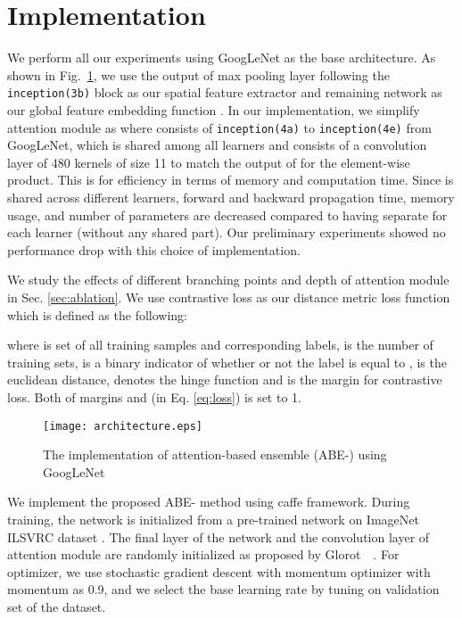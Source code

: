 \documentclass[runningheads]{llncs}
\begin{document}
\vspace{-4mm}
\section{Implementation}
\label{sec:implementation}
\vspace{-2mm}



We perform all our experiments using GoogLeNet \cite{Szegedy_2015_CVPR} as the base architecture. 
As shown in Fig.~\ref{fig:architecture}, 
we use the output of max pooling layer following the \texttt{inception(3b)} block as our spatial feature extractor  and remaining network as our global feature embedding function .
In our implementation, we simplify attention module  as  where  consists of \texttt{inception(4a)} to \texttt{inception(4e)} from GoogLeNet, which is shared among all  learners and  consists of a convolution layer of 480 kernels of size 11 to match the output of  for the element-wise product.
This is for efficiency
in terms of memory and computation time. Since  is shared across
different learners, forward and backward propagation time,
memory usage, and number of parameters are decreased compared to having separate  for each learner
(without any shared part). Our preliminary experiments showed no performance drop with this choice of implementation.

We study the effects of different branching points and depth of attention module in Sec. \ref{sec:ablation}.
We use contrastive loss \cite{hadsell2006dimensionality,bell2015learning,chopra2005learning} as our distance metric loss function which is defined as the following:
\vspace{-2mm}

where  is set of all training samples and corresponding labels,  is the number of training sets,  is a binary indicator of whether or not the label  is equal to ,  is the euclidean distance,  denotes the hinge function  and  is the margin for contrastive loss. Both of margins  and  (in Eq. \ref{eq:loss}) is set to 1.

\begin{figure}[t]
\centering
\texttt{[image: architecture.eps]}
\vspace{-4mm}
\caption{The implementation of attention-based ensemble (ABE-) using GoogLeNet}
\label{fig:architecture}
\vspace{-3mm}
\end{figure}


We implement the proposed ABE- method using caffe \cite{jia2014caffe} framework.
During training, the network is initialized from a pre-trained network on ImageNet ILSVRC dataset \cite{russakovsky2015imagenet}.
The final layer of the network and the convolution layer of attention module are randomly initialized as proposed by Glorot~\etal~\cite{glorot2010understanding}.
For optimizer, we use stochastic gradient descent with momentum optimizer with momentum as 0.9, and we select the base learning rate by tuning on validation set of the dataset.
\end{document}
